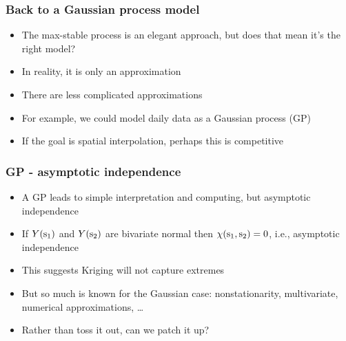 \documentclass{beamer}
\renewcommand{\bs}{ \mbox{\boldmath s}}
\newcommand{\bit}{\begin{itemize}}
\newcommand{\eit}{\end{itemize}}
\begin{document}






\begin{frame}\frametitle{Back to a Gaussian process model}
  \bit\setlength\itemsep{\fill}
  \item The max-stable process is an elegant approach, but does that mean it's the right model?
  \item In reality, it is only an approximation
  \item There are less complicated approximations
  \item For example, we could model daily data as a Gaussian process (GP)
  \item If the goal is spatial interpolation, perhaps this is competitive
\eit
\end{frame}


\begin{frame}\frametitle{GP - asymptotic independence}
  \bit\setlength\itemsep{\fill}
  \item A GP leads to simple interpretation and computing, but asymptotic independence
  \item If $Y(\bs_1)$ and $Y(\bs_2)$ are bivariate normal then $\chi(\bs_1,\bs_2)=0$, i.e., asymptotic independence
  \item This suggests Kriging will not capture extremes
  \item But so much is known for the Gaussian case: nonstationarity, multivariate, numerical approximations, \ldots
  \item Rather than toss it out, can we patch it up?
  \eit
\end{frame}
\end{document}
